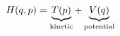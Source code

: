 \documentclass[preview]{standalone}
\begin{document}
\begin{align*}
\special{dvisvgm:raw <g id='unique000'>}H(q,p) = \underbrace{T(p)}_{\text{kinetic}} + \underbrace{V(q)}_{\text{potential}}\special{dvisvgm:raw </g>}
\end{align*}
\end{document}
